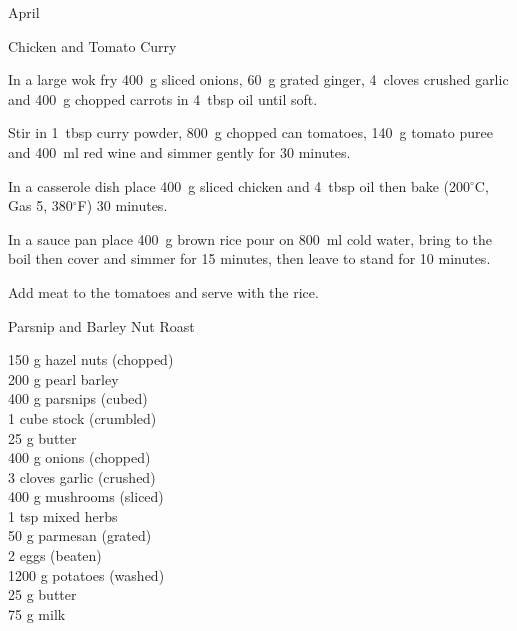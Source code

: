 \begin{menu}{April}
\begin{recipe}{2}{Chicken and Tomato Curry}
\begin{ingredients}
		\end{ingredients}
	
	
	
    \begin{instructions}
    \item 
        In a large wok fry
        400~g sliced onions,
        60~g grated ginger,
        4~cloves crushed garlic
        and
        400~g chopped carrots
        in
        4~tbsp  oil
        until soft.
      \item 
        Stir in
        1~tbsp  curry powder,
        800~g chopped can tomatoes,
        140~g  tomato puree
        and
        400~ml  red wine
        and simmer gently for 30 minutes.
      \item 
        In a casserole dish place
        400~g sliced chicken
        and
        4~tbsp  oil
        then bake (200$^{\circ}$C, Gas 5, 380$^{\circ}$F) 30 minutes.
      \item 
    In a
    sauce pan
    place
    400~g  brown rice
    pour on
    800~ml  cold water,
    bring to the boil then cover and simmer for 15 minutes,
    then leave to stand for 10 minutes.
  \item 
        Add meat to the tomatoes and serve with the rice.
      
    \end{instructions}
    \end{recipe}%
  
    \begin{recipe}{2}{Parsnip and Barley Nut Roast}%
		\begin{ingredients}
		150 g hazel nuts (chopped) \\
	200 g pearl barley  \\
	400 g parsnips (cubed) \\
	1 cube stock (crumbled) \\
	25 g butter  \\
	400 g onions (chopped) \\
	3 cloves garlic (crushed) \\
	400 g mushrooms (sliced) \\
	1 tsp mixed herbs  \\
	50 g parmesan (grated) \\
	2  eggs (beaten) \\
	1200 g potatoes (washed) \\
	25 g butter  \\
	75 g milk  \\
	

\end{ingredients}
\end{recipe}
\end{menu}
